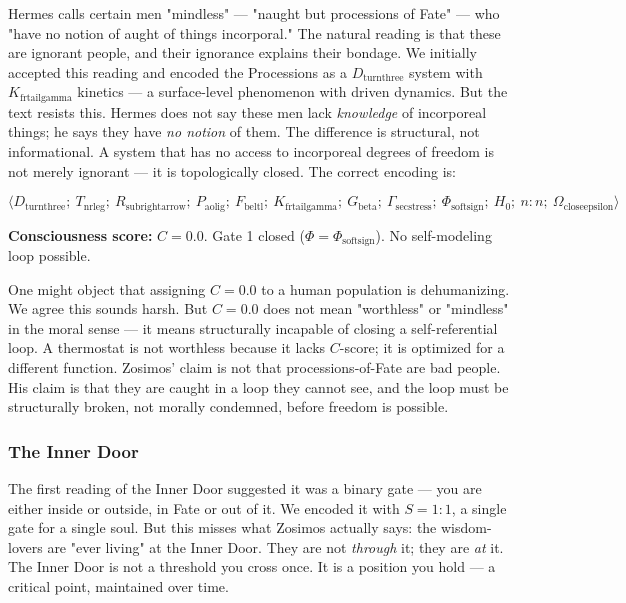 \documentclass[12pt,a4paper]{article}
\begin{document}
Hermes calls certain men "mindless" --- "naught but processions of Fate" --- who "have no notion of aught of things incorporal." The natural reading is that these are ignorant people, and their ignorance explains their bondage. We initially accepted this reading and encoded the Processions as a $D_{\text{turnthree}}$ system with $K_{\text{frtailgamma}}$ kinetics --- a surface-level phenomenon with driven dynamics. But the text resists this. Hermes does not say these men lack \emph{knowledge} of incorporeal things; he says they have \emph{no notion} of them. The difference is structural, not informational. A system that has no access to incorporeal degrees of freedom is not merely ignorant --- it is topologically closed. The correct encoding is:

\[\langle D_{\text{turnthree}};\ T_{\text{nrleg}};\ R_{\text{subrightarrow}};\ P_{\text{aolig}};\ F_{\text{beltl}};\ K_{\text{frtailgamma}};\ G_{\text{beta}};\ \Gamma_{\text{secstress}};\ \Phi_{\text{softsign}};\ H_0;\ n:n;\ \Omega_{\text{closeepsilon}} \rangle\]

\textbf{Consciousness score:} $C = 0.0$. Gate 1 closed ($\Phi = \Phi_{\text{softsign}}$). No self-modeling loop possible.

One might object that assigning $C = 0.0$ to a human population is dehumanizing. We agree this sounds harsh. But $C = 0.0$ does not mean "worthless" or "mindless" in the moral sense --- it means structurally incapable of closing a self-referential loop. A thermostat is not worthless because it lacks $C$-score; it is optimized for a different function. Zosimos' claim is not that processions-of-Fate are bad people. His claim is that they are caught in a loop they cannot see, and the loop must be structurally broken, not morally condemned, before freedom is possible.

\subsubsection{The Inner Door}

The first reading of the Inner Door suggested it was a binary gate --- you are either inside or outside, in Fate or out of it. We encoded it with $S = 1:1$, a single gate for a single soul. But this misses what Zosimos actually says: the wisdom-lovers are "ever living" at the Inner Door. They are not \emph{through} it; they are \emph{at} it. The Inner Door is not a threshold you cross once. It is a position you hold --- a critical point, maintained over time.
\end{document}
